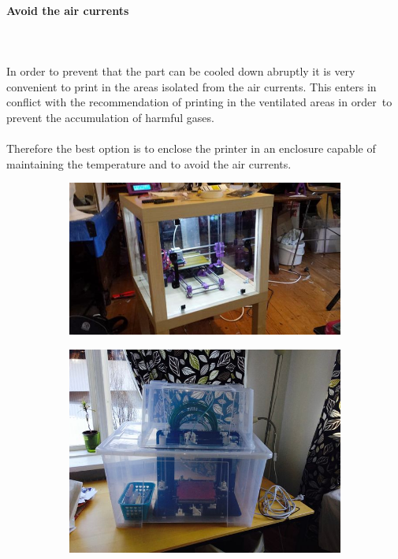 \documentclass[11pt,a4paper]{article}
\begin{document}
			\paragraph{Avoid the air currents}\mbox{}\\\\
In order to prevent that the part can be cooled down abruptly it is very convenient to print in the areas isolated from the air currents. This enters in conflict with the recommendation of printing in the ventilated areas in order to prevent the accumulation of harmful gases.
\\\\
Therefore the best option is to enclose the printer in an enclosure capable of maintaining the temperature and to avoid the air currents.
\begin{figure}[H]
    \centering
    \begin{subfigure}[b]{0.3\textwidth}
        \includegraphics[width=\textwidth,cfbox=azul_marcos 4pt 0pt]{FOTOS/CERRAMIENTO1}
    \end{subfigure}
    \quad %
    \begin{subfigure}[b]{0.3\textwidth}
        \includegraphics[width=\textwidth,cfbox=azul_marcos 4pt 0pt]{FOTOS/CERRAMIENTO2}

\end{subfigure}
\end{figure}
\end{document}
